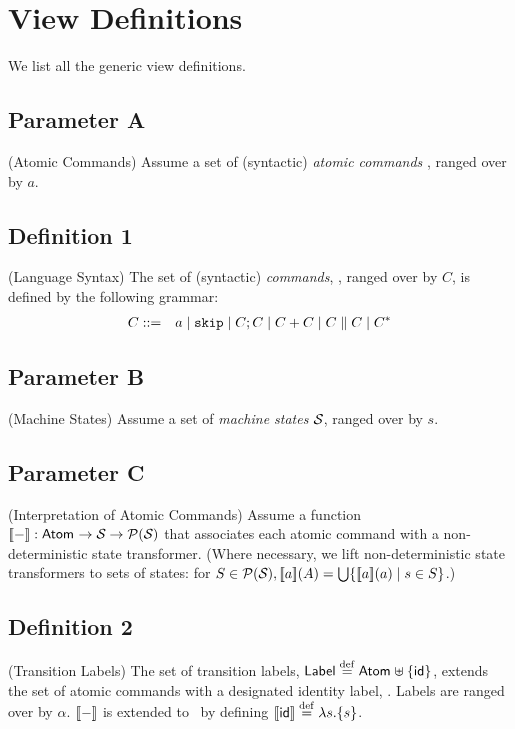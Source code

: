 \section{View Definitions}

We list all the generic view definitions\cite{conf/popl/Dinsdale-YoungBGPY13}.

\setcounter{secnumdepth}{0}


\subsection{Parameter A}(Atomic Commands)
Assume a set of (syntactic)
\emph{atomic commands} \Atom{}, ranged over by $a$.

\subsection{Definition 1} (Language Syntax)
The set of (syntactic) \emph{commands},
\Comm, ranged over by $C$, is defined by the following grammar:
\begin{eqnarray*}
   C &::=& a \mid \mathtt{skip} \mid C ; C \mid C+C \mid C \parallel C \mid C^*
\end{eqnarray*}

\subsection{Parameter B}(Machine States)
Assume a set of \emph{machine states} $\mathcal{S}_{\mathsf{}}$,
ranged over by $s$.

\subsection{Parameter C}(Interpretation of Atomic Commands)
Assume a function $[\![{-}]\!] : \mathsf{Atom_{}} \rightarrow \mathcal{S}_{\mathsf{}} \rightarrow \mathcal{P}(\mathcal{S}_{\mathsf{}})$
that associates each atomic
command with a non-deterministic state transformer. (Where necessary,
we lift non-deterministic state transformers to sets of states:
for $S \in \mathcal{P}(\mathcal{S}_{\mathsf{}}), [\![{a}]\!](A) = \bigcup\{[\![{a}]\!](a) \mid s \in S\}$.)


\subsection{Definition 2} (Transition Labels)
The set of transition labels, $\mathsf{Label} \stackrel{\mathrm{def}}{=} \mathsf{Atom_{}} \uplus \{\mathsf{id}\}$,
extends the set of atomic commands with a
designated identity label, \vid.
Labels are ranged over by $\alpha$.
$[\![{-}]\!]$ is extended to \Label\ by defining $[\![{\mathsf{id}}]\!] \stackrel{\mathrm{def}}{=} \lambda s .\{s\}$.

